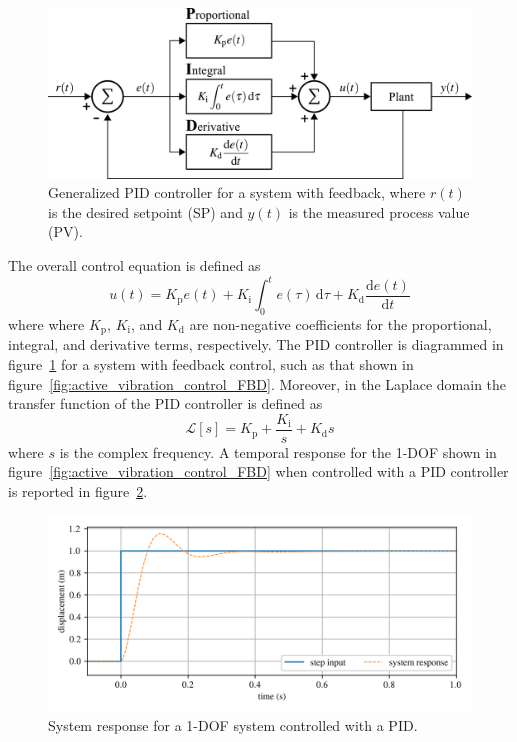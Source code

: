 \documentclass[12pt,letter]{article}
\numberwithin{ex}{section} %
\numberwithin{re}{section} %
\numberwithin{vcs}{section} %
\newcommand{\Laplace}[1]{\ensuremath{\mathcal{L}{\left[#1\right]}}}
\begin{document}
\begin{figure}[H]
	\centering
	\includegraphics[]{../figures/PID_controller.png}
	\caption{Generalized PID controller for a system with feedback, where $r(t)$ is the desired setpoint (SP) and $y(t)$ is the measured process value (PV).}
	\label{fig:PID_controller}
\end{figure}

The overall control equation is defined as
\begin{equation}
	u(t) = K_\text{p} e(t) + K_\text{i} \int_0^t e(\tau) \,\mathrm{d}\tau + K_\text{d} \frac{\mathrm{d}e(t)}{\mathrm{d}t}
\end{equation}
where where $K_\text{p}$, $K_\text{i}$, and $K_\text{d}$ are non-negative coefficients for the proportional, integral, and derivative terms, respectively. The PID controller is diagrammed in figure~\ref{fig:PID_controller} for a system with feedback control, such as that shown in figure~\ref{fig:active_vibration_control_FBD}. Moreover, in the Laplace domain the transfer function of the PID controller is defined as
\begin{equation}
	\Laplace{s} = K_\text{p} + \frac{K_\text{i}}{s} + K_\text{d}s
\end{equation}
where $s$ is the complex frequency. A temporal response for the 1-DOF shown in figure~\ref{fig:active_vibration_control_FBD} when controlled with a PID controller is reported in figure~\ref{fig:PID_temporal_response_1}.

\begin{figure}[H]
	\centering
	\includegraphics[]{../figures/PID_temporal_response_1.png}
	\caption{System response for a 1-DOF system controlled with a PID.}
	\label{fig:PID_temporal_response_1}
\end{figure}
\end{document}
